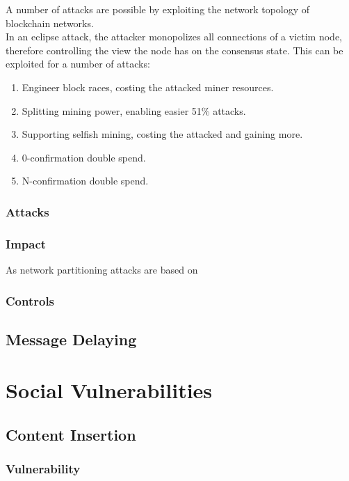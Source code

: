 \documentclass[11pt,a4paper,draft]{article}
\begin{document}
A number of attacks are possible by exploiting the network topology of blockchain networks.\\

In an eclipse attack, the attacker monopolizes all connections of a victim node, therefore controlling the view the node has on the consensus state. This can be exploited for a number of attacks:\\
\begin{enumerate}
  \item Engineer block races, costing the attacked miner resources.
  \item Splitting mining power, enabling easier 51\% attacks.
  \item Supporting selfish mining, costing the attacked and gaining more.
  \item 0-confirmation double spend.
  \item N-confirmation double spend.
\end{enumerate}

\subsubsection{Attacks}

\subsubsection{Impact}

As network partitioning attacks are based on

\subsubsection{Controls}

\subsection{Message Delaying}

\section{Social Vulnerabilities}

\subsection{Content Insertion}

\subsubsection{Vulnerability}
\end{document}
